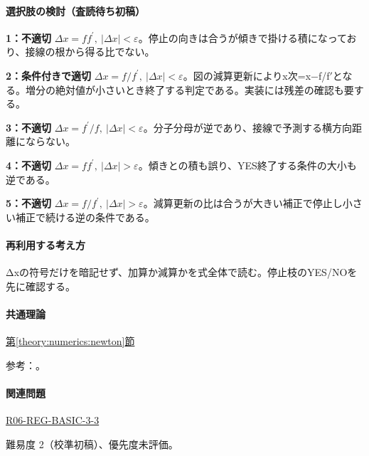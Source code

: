 \paragraph{選択肢の検討（査読待ち初稿）}\mbox{}\par

\noindent\textbf{1：不適切} \(\Delta x=ff^\prime,\ |\Delta x|<\varepsilon\)。停止の向きは合うが傾きで掛ける積になっており、接線の根から得る比でない。\par

\noindent\textbf{2：条件付きで適切} \(\Delta x=f/f^\prime,\ |\Delta x|<\varepsilon\)。図の減算更新によりx次=x−f/f\ensuremath{'}となる。増分の絶対値が小さいとき終了する判定である。実装には残差の確認も要する。\par

\noindent\textbf{3：不適切} \(\Delta x=f^\prime/f,\ |\Delta x|<\varepsilon\)。分子分母が逆であり、接線で予測する横方向距離にならない。\par

\noindent\textbf{4：不適切} \(\Delta x=ff^\prime,\ |\Delta x|>\varepsilon\)。傾きとの積も誤り、YES終了する条件の大小も逆である。\par

\noindent\textbf{5：不適切} \(\Delta x=f/f^\prime,\ |\Delta x|>\varepsilon\)。減算更新の比は合うが大きい補正で停止し小さい補正で続ける逆の条件である。\par

\paragraph{再利用する考え方} Δxの符号だけを暗記せず、加算か減算かを式全体で読む。停止枝のYES/NOを先に確認する。

\paragraph{共通理論} \hyperref[theory:numerics:newton]{第\ref*{theory:numerics:newton}節}

\par 参考：\cite{nist_newton}。

\paragraph{関連問題} \hyperref[q:r06-reg-basic-3-3]{R06-REG-BASIC-3-3}

\par 難易度 2（校準初稿）、優先度未評価。

